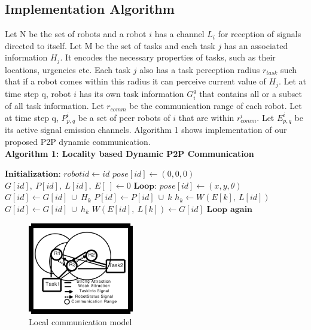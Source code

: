 \documentclass[letterpaper, 10 pt, conference]{ieeeconf}  %
\begin{document}
\subsection{Implementation Algorithm}
%
Let N be the set of robots and a robot $i$ has a channel $L_i$ for reception of signals directed to itself. Let M be the set of  tasks and each task $j$ has an associated information $H_j$. It encodes the necessary properties of tasks, such as their locations, urgencies etc. Each task  $j$ also has a task perception radius $r_{task}$ such that if a robot comes within this radius it can perceive current value of $H_j$.  Let at time step q, robot $i$ has its own task information $G_{i}^{q}$ that contains all or a subset of all task information. Let $r_{comm}$ be the communication range of each robot. 
Let at time step q, $P_{p, q}^{i}$ be a set of peer robots of $i$ that are within $r_{comm}^{i}$. Let $E_{p, q}^{i}$ be its active signal emission channels. Algorithm 1
shows implementation of our proposed P2P dynamic communication.\\    
% 
\textbf{\small Algorithm 1: Locality based Dynamic P2P Communication}
\begin{algorithmic}[1]
\label{alg:p2p-comm}
\State $\textbf{Initialization:}$
	\State $robotid \gets id$
	\State $pose[id] \gets (0, 0, 0)$
	\State $G[id], ~P[id], ~L[id], ~E[~] \gets 0$
\State $\textbf{Loop:}$
	\State $pose[id] \gets (x, y, \theta)$
		\State $G[id] \gets G[id] ~\cup ~ H_k$
	\EndIf
		\State $P[id] \gets P[id] ~ \cup ~ k$
		\State  $h_k \gets W(E[k],~ L[id])$
		\State $G[id] \gets G[id] ~ \cup ~ h_k$
	\EndIf
		\State $ W(E[id],~L[k]) \gets G[id]$
	\EndFor
\State $\textbf{Loop again}$
\end{algorithmic}

\begin{figure}[thpb]
\centering
\includegraphics[height=4cm, angle=0]{../dia-files/LocalComm.eps}
\caption{Local communication model}
\label{fig:lcm} %
\end{figure}
%
\end{document}

